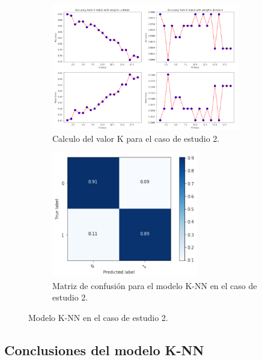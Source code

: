 \begin{figure}[!htb]
    \begin{subfigure}[b]{0.45\linewidth}
    	\centering
	    \includegraphics[width=0.9\textwidth]{images/resultados_knn_ent_conjunto2.png}
    	\caption{Calculo del valor K para el caso de estudio 2.}
		\label{knnTrainCase2}
	\end{subfigure}
	\begin{subfigure}[b]{0.45\linewidth} 
		\centering
		\includegraphics[width=0.7\textwidth]{images/resultados_knn_cm_conjunto2.png}
		\caption{Matriz de confusión para el modelo K-NN en el caso de estudio 2.}
		\label{knnCMCase2}
	\end{subfigure}
	\caption{Modelo K-NN en el caso de estudio 2.}
	\label{knnCase1}
\end{figure}

\subsection{Conclusiones del modelo K-NN}
\label{resultados:knn_conclusiones}

